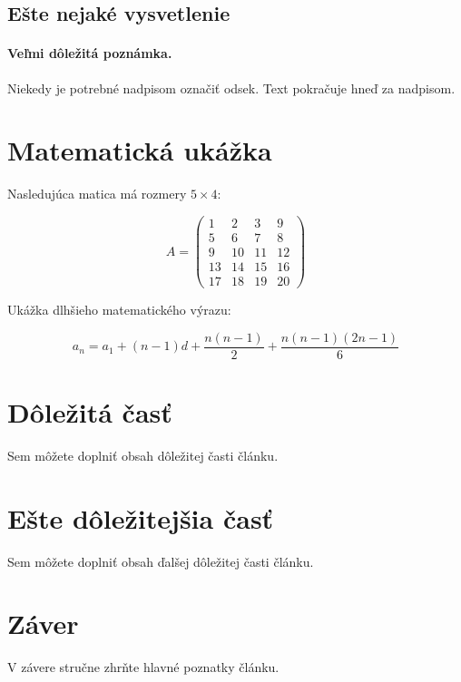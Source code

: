 \documentclass[10pt,twocolumn,twoside,slovak,a4paper]{article}
\begin{document}
\subsection{Ešte nejaké vysvetlenie}
\label{ina:este}

\paragraph{Veľmi dôležitá poznámka.}
Niekedy je potrebné nadpisom označiť odsek.
Text pokračuje hneď za nadpisom.


\section{Matematická ukážka}
\label{matematika}

Nasledujúca matica má rozmery $5 \times 4$:

\[
A =
\begin{pmatrix}
1 & 2 & 3 & 9 \\
5 & 6 & 7 & 8 \\
9 & 10 & 11 & 12 \\
13 & 14 & 15 & 16 \\
17 & 18 & 19 & 20
\end{pmatrix}
\]

Ukážka dlhšieho matematického výrazu:

\[
a_n =
a_1 + (n-1)d
+ \frac{n(n-1)}{2}
+ \frac{n(n-1)(2n-1)}{6}
\]


\section{Dôležitá časť}
\label{dolezita}

Sem môžete doplniť obsah dôležitej časti článku.


\section{Ešte dôležitejšia časť}
\label{dolezitejsia}

Sem môžete doplniť obsah ďalšej dôležitej časti článku.


\section{Záver}
\label{zaver}

V závere stručne zhrňte hlavné poznatky článku.




\end{document}
